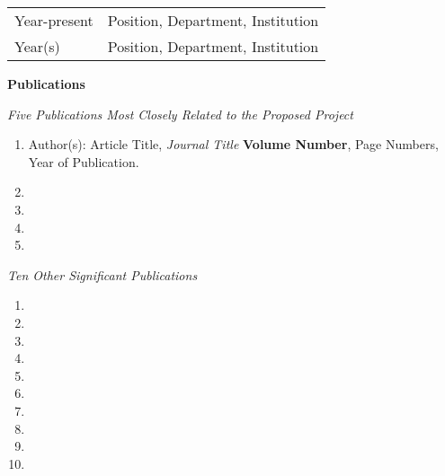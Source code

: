 \begin{tabular}{ll}
Year-present & Position, Department, Institution \\
Year(s)      & Position, Department, Institution \\
\end{tabular}



\vspace{12pt}
{\bf  Publications}

\vspace{12pt}
\emph{Five Publications Most Closely Related to the Proposed Project}

\begin{enumerate}
\item Author(s): Article Title, \emph{Journal Title} {\bf Volume Number}, Page Numbers, Year of Publication.

\item

\item

\item

\item
\end{enumerate}

\vspace{12pt}
\emph{Ten Other Significant Publications}

\begin{enumerate}
\item

\item

\item

\item

\item

\item

\item

\item

\item

\item
\end{enumerate}

